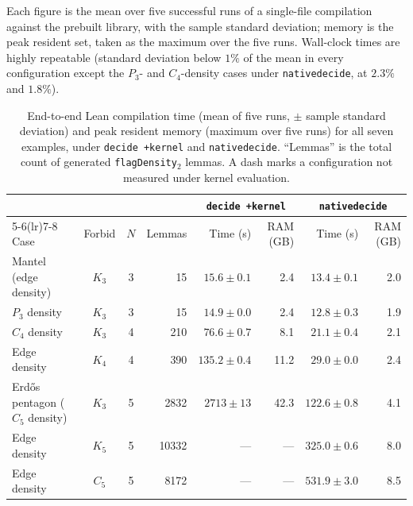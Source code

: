\documentclass[acmsmall,screen=true,acmthm=false]{acmart}
\DeclareRobustCommand{\lean}[1]{{\def\_{\textunderscore\allowbreak}\texttt{#1}}}
\begin{document}
Each figure is the mean over five successful runs of a single-file compilation
against the prebuilt library, with the sample standard deviation; memory is the
peak resident set, taken as the maximum over the five runs.  Wall-clock times
are highly repeatable (standard deviation below $1\%$ of the mean in every
configuration except the $P_3$- and $C_4$-density cases under
\lean{native\_decide}, at $2.3\%$ and $1.8\%$).

\begin{table}[h]
  \centering
  \caption{End-to-end Lean compilation time (mean of five runs, $\pm$ sample
    standard deviation) and peak resident memory (maximum over five runs) for
    all seven examples, under \lean{decide +kernel} and \lean{native\_decide}.
    ``Lemmas'' is the total count of generated \lean{flagDensity}$_2$
    lemmas.  A dash marks a configuration not measured under kernel evaluation.}
  \label{tab:compile-times}
  \small
  \setlength{\tabcolsep}{4.5pt}
  \begin{tabular}{lccr rr rr}
    \toprule
    & & & & \multicolumn{2}{c}{\lean{decide +kernel}}
        & \multicolumn{2}{c}{\lean{native\_decide}} \\
    \cmidrule(lr){5-6}\cmidrule(lr){7-8}
    Case & Forbid & $N$ & Lemmas
      & Time (s) & RAM (GB) & Time (s) & RAM (GB) \\
    \midrule
    Mantel (edge density)              & $K_3$ & 3 &    15 & $15.6\pm0.1$   &  2.4 & $13.4\pm0.1$  & 2.0 \\
    $P_3$ density                      & $K_3$ & 3 &    15 & $14.9\pm0.0$   &  2.4 & $12.8\pm0.3$  & 1.9 \\
    $C_4$ density                      & $K_3$ & 4 &   210 & $76.6\pm0.7$   &  8.1 & $21.1\pm0.4$  & 2.1 \\
    Edge density                       & $K_4$ & 4 &   390 & $135.2\pm0.4$  & 11.2 & $29.0\pm0.0$  & 2.4 \\
    Erd\H{o}s pentagon ($C_5$ density) & $K_3$ & 5 &  2832 & $2713\pm13$    & 42.3 & $122.6\pm0.8$ & 4.1 \\
    Edge density                       & $K_5$ & 5 & 10332 & ---            & ---  & $325.0\pm0.6$ & 8.0 \\
    Edge density                       & $C_5$ & 5 &  8172 & ---            & ---  & $531.9\pm3.0$ & 8.5 \\
    \bottomrule
  \end{tabular}
\end{table}
\end{document}
